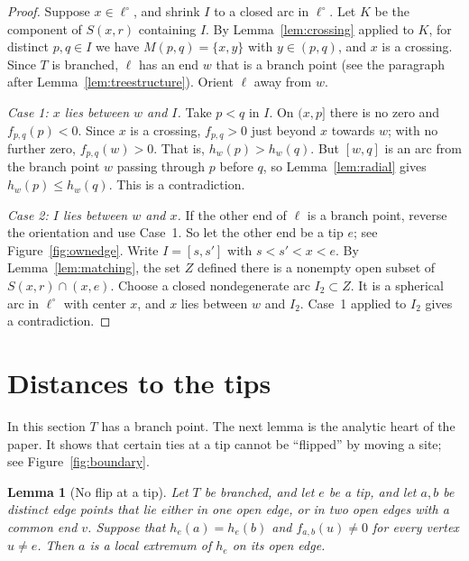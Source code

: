 \documentclass[11pt]{amsart}
\newtheorem{lemma}[theorem]{Lemma}
\theoremstyle{definition}
\theoremstyle{remark}
\newcommand{\M}{M}
\begin{document}
\begin{proof}
Suppose $x\in\ell^\circ$, and shrink $I$ to a closed arc in $\ell^\circ$. Let $K$ be the component of $S(x,r)$ containing $I$. By Lemma~\ref{lem:crossing} applied to $K$, for distinct $p,q\in I$ we have $\M(p,q)=\{x,y\}$ with $y\in(p,q)$, and $x$ is a crossing. Since $T$ is branched, $\ell$ has an end $w$ that is a branch point (see the paragraph after Lemma~\ref{lem:treestructure}). Orient $\ell$ away from $w$.

\emph{Case 1: $x$ lies between $w$ and $I$.} Take $p<q$ in $I$. On $(x,p]$ there is no zero and $f_{p,q}(p)<0$. Since $x$ is a crossing, $f_{p,q}>0$ just beyond $x$ towards $w$; with no further zero, $f_{p,q}(w)>0$. That is, $h_w(p)>h_w(q)$. But $[w,q]$ is an arc from the branch point $w$ passing through $p$ before $q$, so Lemma~\ref{lem:radial} gives $h_w(p)\le h_w(q)$. This is a contradiction.

\emph{Case 2: $I$ lies between $w$ and $x$.} If the other end of $\ell$ is a branch point, reverse the orientation and use Case~1. So let the other end be a tip $e$; see Figure~\ref{fig:ownedge}. Write $I=[s,s']$ with $s<s'<x<e$. By Lemma~\ref{lem:matching}, the set $Z$ defined there is a nonempty open subset of $S(x,r)\cap(x,e)$. Choose a closed nondegenerate arc $I_2\subset Z$. It is a spherical arc in $\ell^\circ$ with center $x$, and $x$ lies between $w$ and $I_2$. Case~1 applied to $I_2$ gives a contradiction.
\end{proof}

\section{Distances to the tips}\label{sec:tips}

In this section $T$ has a branch point. The next lemma is the analytic heart of the paper. It shows that certain ties at a tip cannot be ``flipped'' by moving a site; see Figure~\ref{fig:boundary}.

\begin{lemma}[No flip at a tip]\label{lem:boundary}
Let $T$ be branched, and let $e$ be a tip, and let $a,b$ be distinct edge points that lie either in one open edge, or in two open edges with a common end $v$. Suppose that $h_e(a)=h_e(b)$ and $f_{a,b}(u)\ne0$ for every vertex $u\ne e$. Then $a$ is a local extremum of $h_e$ on its open edge.
\end{lemma}
\end{document}
